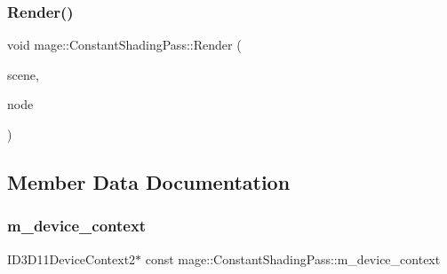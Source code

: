 \hypertarget{classmage_1_1_constant_shading_pass_a0900c426f0c4c427d81d8035c2c30f3f}{}\label{classmage_1_1_constant_shading_pass_a0900c426f0c4c427d81d8035c2c30f3f} 
\subsubsection{\texorpdfstring{Render()}{Render()}}
{\footnotesize\ttfamily void mage\+::\+Constant\+Shading\+Pass\+::\+Render (\begin{DoxyParamCaption}\item[{const \hyperlink{structmage_1_1_pass_buffer}{Pass\+Buffer} $\ast$}]{scene,  }\item[{const \hyperlink{classmage_1_1_camera_node}{Camera\+Node} $\ast$}]{node }\end{DoxyParamCaption})}



\subsection{Member Data Documentation}
\hypertarget{classmage_1_1_constant_shading_pass_a743bb9ce4f40514498f36c2d4cf0b32c}{}\label{classmage_1_1_constant_shading_pass_a743bb9ce4f40514498f36c2d4cf0b32c} 
\subsubsection{\texorpdfstring{m\+\_\+device\+\_\+context}{m\_device\_context}}
{\footnotesize\ttfamily I\+D3\+D11\+Device\+Context2$\ast$ const mage\+::\+Constant\+Shading\+Pass\+::m\+\_\+device\+\_\+context\hspace{0.3cm}{\ttfamily [private]}}

\hypertarget{classmage_1_1_constant_shading_pass_ae828b9ae1e4cd281f346aca0db34c015}{}\label{classmage_1_1_constant_shading_pass_ae828b9ae1e4cd281f346aca0db34c015} 
